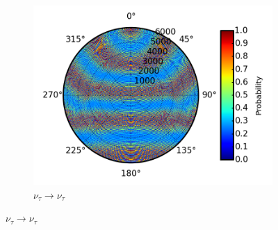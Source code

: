\documentclass{beamer}
\begin{document}
\begin{frame}
\begin{figure}
\begin{subfigure}[b]{0.33\linewidth}
			\caption{ $\nu_{\tau} \rightarrow \nu_{\tau}$ }
			\includegraphics[width=\linewidth]{earth_0.1gev_nutau2nutau_throughEarth.png}
		\end{subfigure}
	\end{figure}
\end{frame}
\end{document}

